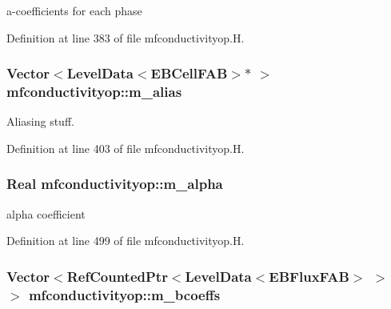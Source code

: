 a-\/coefficients for each phase 



Definition at line 383 of file mfconductivityop.\+H.

\subsubsection[{\texorpdfstring{m\+\_\+alias}{m_alias}}]{\setlength{\rightskip}{0pt plus 5cm}Vector$<$Level\+Data$<$E\+B\+Cell\+F\+AB$>$$\ast$ $>$ mfconductivityop\+::m\+\_\+alias\hspace{0.3cm}{\ttfamily [protected]}}\hypertarget{classmfconductivityop_a5ae0e536cd2648df3e3a7154a8d28abc}{}\label{classmfconductivityop_a5ae0e536cd2648df3e3a7154a8d28abc}


Aliasing stuff. 



Definition at line 403 of file mfconductivityop.\+H.

\subsubsection[{\texorpdfstring{m\+\_\+alpha}{m_alpha}}]{\setlength{\rightskip}{0pt plus 5cm}Real mfconductivityop\+::m\+\_\+alpha\hspace{0.3cm}{\ttfamily [protected]}}\hypertarget{classmfconductivityop_afc24218470ca35014bd351e7b4c6cf20}{}\label{classmfconductivityop_afc24218470ca35014bd351e7b4c6cf20}


alpha coefficient 



Definition at line 499 of file mfconductivityop.\+H.

\subsubsection[{\texorpdfstring{m\+\_\+bcoeffs}{m_bcoeffs}}]{\setlength{\rightskip}{0pt plus 5cm}Vector$<$Ref\+Counted\+Ptr$<$Level\+Data$<$E\+B\+Flux\+F\+AB$>$ $>$ $>$ mfconductivityop\+::m\+\_\+bcoeffs\hspace{0.3cm}{\ttfamily [protected]}}\hypertarget{classmfconductivityop_a44282d41bc1f23912addf5b8d4dbe1ff}{}\label{classmfconductivityop_a44282d41bc1f23912addf5b8d4dbe1ff}



